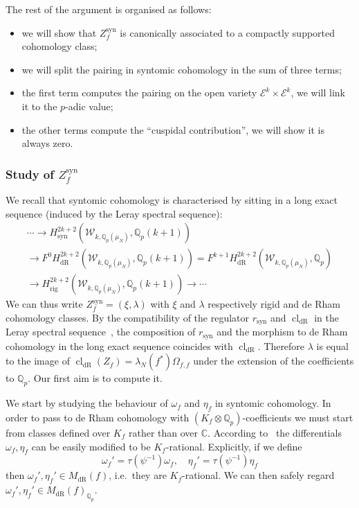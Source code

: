 \documentclass[11pt, a4paper, reqno]{amsart}
\theoremstyle{definition}
\theoremstyle{plain}
\theoremstyle{remark}
\DeclareMathOperator{\cl}{cl}
\DeclareMathOperator{\syn}{syn}
\DeclareMathOperator{\rig}{rig}
\DeclareMathOperator{\dR}{dR}
\newcommand{\numberset}{\mathbb}
\newcommand{\C}{\numberset{C}}
\newcommand{\Q}{\numberset{Q}}
\newcommand{\Ell}{\mathcal{E}}
\newcommand{\KS}{\mathscr{W}}
\newcommand{\regulator}[1]{r_{#1}}
\newcommand{\rsyn}{\regulator{\syn}}
\begin{document}
  The rest of the argument is organised as follows:
  \begin{itemize}
      \item we will show that $Z_f^{\syn}$ is canonically associated to a compactly supported cohomology class;
      \item we will split the pairing in syntomic cohomology in the sum of three terms;
      \item the first term computes the pairing on the open variety $\Ell^k \times \Ell^k$, we will link it to the $p$-adic value;
      \item the other terms compute the ``cuspidal contribution'', we will show it is always zero.
  \end{itemize}

\subsubsection*{Study of $Z_f^{\syn}$}

  We recall that syntomic cohomology is characterised by sitting in a long exact sequence (induced by the Leray spectral sequence):
  \begin{multline*}
      \cdots \to H_{\syn}^{2k+2}(\KS_{k,\Q_p(\mu_N)},\Q_p(k+1)) \\
      \to F^0 H_{\dR}^{2k+2}(\KS_{k,\Q_p(\mu_N)},\Q_p(k+1)) = F^{k+1} H_{\dR}^{2k+2}(\KS_{k,\Q_p(\mu_N)},\Q_p) \\
      \to H_{\rig}^{2k+2}(\KS_{k,\Q_p(\mu_N)},\Q_p(k+1)) \to \cdots
  \end{multline*}
  We can thus write $Z_f^{\syn} = (\xi,\lambda)$ with $\xi$ and $\lambda$ respectively rigid and de Rham cohomology classes. By the compatibility of the regulator $\rsyn$ and $\cl_{\dR}$ in the Leray spectral sequence~\cite[Theorem~7.5]{besser00}, the composition of $\rsyn$ and the morphism to de Rham cohomology in the long exact sequence coincides with $\cl_{\dR}$. Therefore $\lambda$ is equal to the image of $\cl_{\dR}(Z_f) = \lambda_N(f^*)\Omega_{f,f}$ under the extension of the coefficients to $\Q_p$. Our first aim is to compute it.

  We start by studying the behaviour of $\omega_f$ and $\eta_f$ in syntomic cohomology. In order to pass to de Rham cohomology with $(K_f\otimes\Q_p)$-coefficients we must start from classes defined over $K_f$ rather than over $\C$. According to~\cite[§6.1]{KLZ17} the differentials $\omega_f, \eta_f$ can be easily modified to be $K_f$-rational. Explicitly, if we define
  \[
      \omega_f' = \tau(\psi^{-1})\omega_f, \quad \eta_f' = \tau(\psi^{-1})\eta_f
  \]
  then $\omega_f', \eta_f' \in M_{\dR}(f)$, i.e.\ they are $K_f$-rational. We can then safely regard $\omega_f', \eta_f' \in M_{\dR}(f)_{\Q_p}$. 
  
\end{document}
